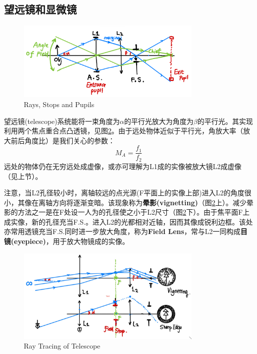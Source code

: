 \documentclass[12pt]{ctexart}%
\begin{document}
\subsection*{望远镜和显微镜}
\begin{figure}[t] %
    \centering
    \includegraphics[width=0.8\textwidth]{Image/2_pupil.jpeg}
    \caption{Rays, Stops and Pupils}
    \label{pupil}
\end{figure}
\par 望远镜(telescope)系统能将一束角度为$\alpha$的平行光放大为角度为$\beta$的平行光。其实现利用两个焦点重合点凸透镜，见图\ref{telescope}。由于远处物体近似于平行光，角放大率（放大前后角度比）是我们关心的参数：
\begin{equation}
    M_A=\frac{f_1}{f_2}
\end{equation}
远处的物体仍在无穷远处成虚像，或亦可理解为L1成的实像被放大镜L2成虚像（见上节）。
\par 注意，当L2孔径较小时，离轴较远的点光源(F平面上的实像上部)进入L2的角度很小，其像在离轴方向将逐渐变暗。该现象称为\textbf{晕影(vignetting)}（图\ref{telescope}上）。减少晕影的方法之一是在F处设一人为的孔径使之小于L2尺寸（图\ref{telescope}下）。由于焦平面F上成实像，新的孔径充当F.S.。进入L2的光都相对近轴，因而其像成锐利边框。该处亦常用透镜充当F.S.同时进一步放大角度，称为\textbf{Field Lens}，常与L2一同构成\textbf{目镜(eyepiece)}，用于放大物镜成的实像。
\begin{figure}[t] %
    \centering
    \includegraphics[width=0.8\textwidth]{Image/2_lens_ray_2.jpg}
    \caption{Ray Tracing of Telescope}
    \label{telescope}
\end{figure}
\end{document}
